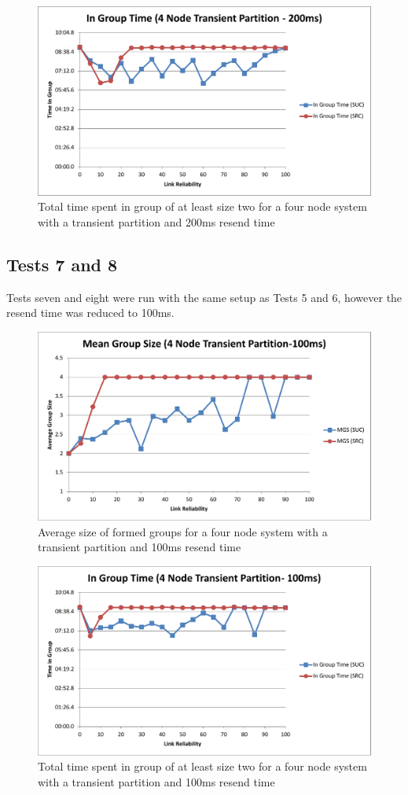 \documentclass{llncs}
\begin{document}
\begin{figure}[!h]
\centering
\includegraphics[width=.74\textwidth]{IGT-TRANS-200.pdf}
\caption{Total time spent in group of at least size two for a four node system with a transient partition and 200ms resend time}
\label{fig:IGT-TRANS-200}
\end{figure}

\subsection{Tests 7 and 8}

Tests seven and eight were run with the same setup as Tests 5 and 6, however the resend time was reduced to 100ms.

\begin{figure}[!h]
\centering
\includegraphics[width=.74\textwidth]{MGS-TRANS-100.pdf}
\caption{Average size of formed groups for a four node system with a transient partition and 100ms resend time}
\label{fig:MGS-TRANS-100}
\end{figure}

\begin{figure}[!h]
\centering
\includegraphics[width=.74\textwidth]{IGT-TRANS-100.pdf}
\caption{Total time spent in group of at least size two for a four node system with a transient partition and 100ms resend time}
\label{fig:IGT-TRANS-100}
\end{figure}
\end{document}
